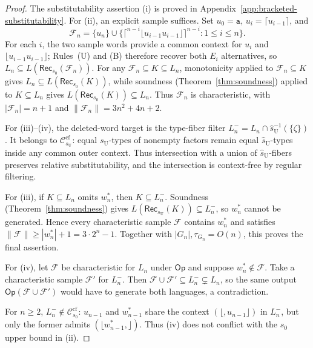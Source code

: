 \documentclass[11pt,a4paper]{article}
\theoremstyle{remark}
\theoremstyle{plain}
\newcommand{\cf}{\mathrm{cf}}
\newcommand{\Ccf}[1]{\mathcal C_{#1}^{\cf}}
\begin{document}
\begin{proof}
The substitutability assertion (i) is proved in
Appendix~\ref{app:bracketed-substitutability}.
For (ii), an explicit sample suffices. Set $u_0=\mathtt a$,
$u_i=\lceil{}u_{i-1}\rceil$, and
\[
\mathcal F_n=\{u_n\}\cup
\{\lceil^{n-i}\lfloor u_{i-1}u_{i-1}\rfloor
\rceil^{n-i}:1\le i\le n\}.
\]
For each $i$, the two sample words provide a common context for
$u_i$ and $\lfloor u_{i-1}u_{i-1}\rfloor$;
Rules~\textup{(U)} and \textup{(B)} therefore recover both
$E_i$ alternatives, so
$L_n\subseteq L(\mathsf{Rec}_{s_0}(\mathcal F_n))$.
For any $\mathcal F_n\subseteq K\subseteq L_n$, monotonicity
applied to $\mathcal F_n\subseteq K$ gives
$L_n\subseteq L(\mathsf{Rec}_{s_0}(K))$, while soundness
(Theorem~\ref{thm:soundness}) applied to $K\subseteq L_n$ gives
$L(\mathsf{Rec}_{s_0}(K))\subseteq L_n$.
Thus $\mathcal F_n$ is characteristic, with
$|\mathcal F_n|=n+1$ and $\|\mathcal F_n\|=3n^2+4n+2$.

For (iii)--(iv), the deleted-word target is the type-fiber
filter
$L_n^-=L_n\cap\widehat{s}_{\mathrm U}^{-1}(\{\zeta\})$.
It belongs to $\Ccf{s_{\mathrm U}}$: equal
$s_{\mathrm U}$-types of nonempty factors remain
equal $\widehat{s}_{\mathrm U}$-types inside any
common outer context. Thus intersection with
a union of $\widehat{s}_{\mathrm U}$-fibers
preserves relative substitutability, and the
intersection is context-free by regular filtering.

For (iii), if $K\subseteq L_n$ omits $w_n^*$, then
$K\subseteq L_n^-$. Soundness (Theorem~\ref{thm:soundness})
gives $L(\mathsf{Rec}_{s_{\mathrm U}}(K))\subseteq L_n^-$,
so $w_n^*$ cannot be generated. Hence every characteristic
sample $\mathcal F$ contains $w_n^*$ and satisfies
$\|\mathcal F\|\ge |w_n^*|+1=3\cdot2^n-1$.
Together with $|G_n|,\tau_{G_n}=O(n)$, this proves
the final assertion.

For (iv), let $\mathcal F$ be characteristic for $L_n$ under
$\mathsf{Op}$ and suppose $w_n^*\notin\mathcal F$.
Take a characteristic sample $\mathcal F'$ for $L_n^-$.
Then $\mathcal F\cup\mathcal F'\subseteq L_n^-\subsetneq L_n$,
so the same output $\mathsf{Op}(\mathcal F\cup\mathcal F')$
would have to generate both languages, a contradiction.

For $n\ge2$, $L_n^-\notin\Ccf{s_0}$:
$u_{n-1}$ and $w_{n-1}^*$ share the context
$(\lfloor,u_{n-1}\rfloor)$ in $L_n^-$, but only the former
admits $(\lfloor w_{n-1}^*,\rfloor)$.
Thus (iv) does not conflict with the $s_0$ upper bound in (ii).
\end{proof}
\end{document}
